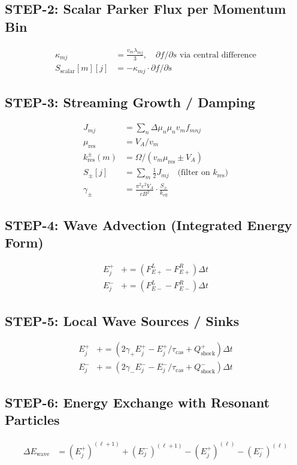 {\subsection*{STEP-2: Scalar Parker Flux per Momentum Bin}
\begin{align*}
\kappa_{mj} &= \frac{v_m \lambda_{mj}}{3},\quad \partial f/\partial s \text{ via central difference} \\
S_\text{scalar}[m][j] &= -\kappa_{mj} \cdot \partial f/\partial s
\end{align*}

\subsection*{STEP-3: Streaming \textrightarrow{} Growth / Damping}
\begin{align*}
J_{mj} &= \sum_n \Delta \mu_n \mu_n v_m f_{mnj} \\
\mu_\text{res} &= V_A / v_m \\
k_\text{res}^{\pm}(m) &= \Omega / (v_m \mu_\text{res} \pm V_A) \\
S_\pm[j] &= \sum_m \tfrac{1}{2} J_{mj} \quad \text{(filter on $k_\text{res}$)} \\
\gamma_\pm &= \frac{\pi^2 e^2 V_A}{c B^2} \cdot \frac{S_\pm}{k_\text{eff}}
\end{align*}

\subsection*{STEP-4: Wave Advection (Integrated Energy Form)}
\begin{align*}
E^+_j &+= (F_{E+}^L - F_{E+}^R) \Delta t \\
E^-_j &+= (F_{E-}^L - F_{E-}^R) \Delta t
\end{align*}

\subsection*{STEP-5: Local Wave Sources / Sinks}
\begin{align*}
E^+_j &+= (2\gamma_+ E^+_j - E^+_j/\tau_\text{cas} + Q_\text{shock}^+) \Delta t \\
E^-_j &+= (2\gamma_- E^-_j - E^-_j/\tau_\text{cas} + Q_\text{shock}^-) \Delta t
\end{align*}

\subsection*{STEP-6: Energy Exchange with Resonant Particles}
\begin{align*}
\Delta E_\text{wave} &= (E^+_j)^{(\ell+1)} + (E^-_j)^{(\ell+1)} - (E^+_j)^{(\ell)} - (E^-_j)^{(\ell)}
\end{align*}

}
